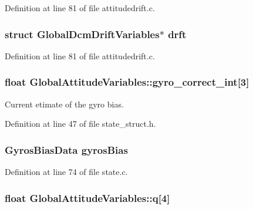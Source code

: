\-Definition at line 81 of file attitudedrift.\-c.

\hypertarget{group___state_estimation_filters_ga89657be5e41cdb8b74d42e587333115a}{
\subsubsection[{drft}]{\setlength{\rightskip}{0pt plus 5cm}struct {\bf \-Global\-Dcm\-Drift\-Variables}$\ast$ {\bf drft}}}\label{group___state_estimation_filters_ga89657be5e41cdb8b74d42e587333115a}


\-Definition at line 81 of file attitudedrift.\-c.

\hypertarget{group___state_estimation_filters_gac754011cf55a0c78cb770e48567802ba}{
\subsubsection[{gyro\-\_\-correct\-\_\-int}]{\setlength{\rightskip}{0pt plus 5cm}float {\bf \-Global\-Attitude\-Variables\-::gyro\-\_\-correct\-\_\-int}\mbox{[}3\mbox{]}}}\label{group___state_estimation_filters_gac754011cf55a0c78cb770e48567802ba}


\-Current etimate of the gyro bias. 



\-Definition at line 47 of file state\-\_\-struct.\-h.

\hypertarget{group___state_estimation_filters_ga233a2d6850e9c466f80ae6bb2ebd98e8}{
\subsubsection[{gyros\-Bias}]{\setlength{\rightskip}{0pt plus 5cm}\-Gyros\-Bias\-Data {\bf gyros\-Bias}}}\label{group___state_estimation_filters_ga233a2d6850e9c466f80ae6bb2ebd98e8}


\-Definition at line 74 of file state.\-c.

\hypertarget{group___state_estimation_filters_ga34a6662a3aea49780925afa629a917cf}{
\subsubsection[{q}]{\setlength{\rightskip}{0pt plus 5cm}float {\bf \-Global\-Attitude\-Variables\-::q}\mbox{[}4\mbox{]}}}\label{group___state_estimation_filters_ga34a6662a3aea49780925afa629a917cf}


